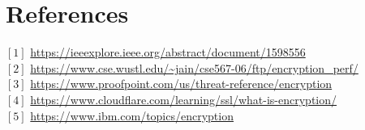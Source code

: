 \documentclass[a4paper]{article}
\begin{document}
\section{References}
$[1]$ \url{https://ieeexplore.ieee.org/abstract/document/1598556}\\
$[2]$ \url{https://www.cse.wustl.edu/~jain/cse567-06/ftp/encryption_perf/}\\
$[3]$ \url{https://www.proofpoint.com/us/threat-reference/encryption}\\
$[4]$ \url{https://www.cloudflare.com/learning/ssl/what-is-encryption/}\\
$[5]$ \url{https://www.ibm.com/topics/encryption}\\ 
\end{document}
